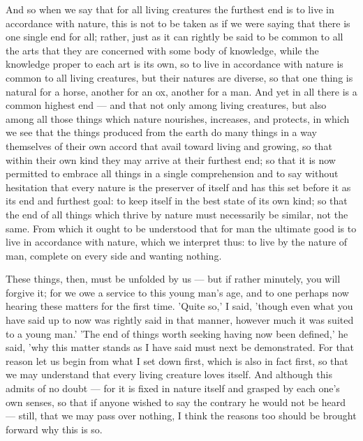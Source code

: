  And so when we say that for all living creatures the furthest end is to live in accordance with nature, this is not to be taken as if we were saying that there is one single end for all; rather, just as it can rightly be said to be common to all the arts that they are concerned with some body of knowledge, while the knowledge proper to each art is its own, so to live in accordance with nature is common to all living creatures, but their natures are diverse, so that one thing is natural for a horse, another for an ox, another for a man. And yet in all there is a common highest end — and that not only among living creatures, but also among all those things which nature nourishes, increases, and protects, in which we see that the things produced from the earth do many things in a way themselves of their own accord that avail toward living and growing, so that within their own kind they may arrive at their furthest end; so that it is now permitted to embrace all things in a single comprehension and to say without hesitation that every nature is the preserver of itself and has this set before it as its end and furthest goal: to keep itself in the best state of its own kind; so that the end of all things which thrive by nature must necessarily be similar, not the same. From which it ought to be understood that for man the ultimate good is to live in accordance with nature, which we interpret thus: to live by the nature of man, complete on every side and wanting nothing.

 These things, then, must be unfolded by us — but if rather minutely, you will forgive it; for we owe a service to this young man's age, and to one perhaps now hearing these matters for the first time. 'Quite so,' I said, 'though even what you have said up to now was rightly said in that manner, however much it was suited to a young man.' 'The end of things worth seeking having now been defined,' he said, 'why this matter stands as I have said must next be demonstrated. For that reason let us begin from what I set down first, which is also in fact first, so that we may understand that every living creature loves itself. And although this admits of no doubt — for it is fixed in nature itself and grasped by each one's own senses, so that if anyone wished to say the contrary he would not be heard — still, that we may pass over nothing, I think the reasons too should be brought forward why this is so.

